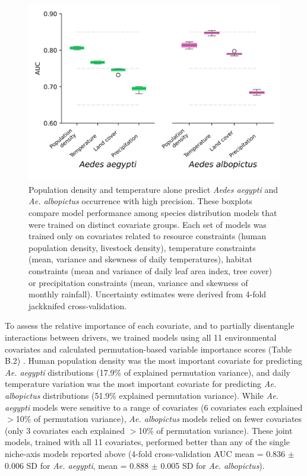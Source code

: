 \begin{figure}[!ht]
\includegraphics[width=\textwidth]{figures/ch3-importance.pdf}
\centering
\caption[Population density and temperature alone predict \textit{Aedes aegypti} and \textit{Ae. albopictus} occurrence with high precision.]{Population density and temperature alone predict \textit{Aedes aegypti} and \textit{Ae. albopictus} occurrence with high precision. These boxplots compare model performance among species distribution models that were trained on distinct covariate groups. Each set of models was trained only on covariates related to resource constraints (human population density, livestock density), temperature constraints (mean, variance and skewness of daily temperatures), habitat constraints (mean and variance of daily leaf area index, tree cover) or precipitation constraints (mean, variance and skewness of monthly rainfall). Uncertainty estimates were derived from 4-fold jackknifed cross-validation.}
\label{fig:importance}
\end{figure}

To assess the relative importance of each covariate, and to partially disentangle interactions between drivers, we trained models using all 11 environmental covariates and calculated permutation-based variable importance scores (Table B.2) \cite{Phillips2008-ic}. Human population density was the most important covariate for predicting \textit{Ae. aegypti} distributions (17.9\% of explained permutation variance), and daily temperature variation was the most important covariate for predicting \textit{Ae. albopictus} distributions (51.9\% explained permutation variance). While \textit{Ae. aegypti} models were sensitive to a range of covariates (6 covariates each explained $>$10\% of permutation variance), \textit{Ae. albopictus} models relied on fewer covariates (only 3 covariates each explained $>$10\% of permutation variance). These joint models, trained with all 11 covariates, performed better than any of the single niche-axis models reported above (4-fold cross-validation AUC mean = 0.836 $\pm$ 0.006 SD for \textit{Ae. aegypti}, mean = 0.888 $\pm$ 0.005 SD for \textit{Ae. albopictus}).

